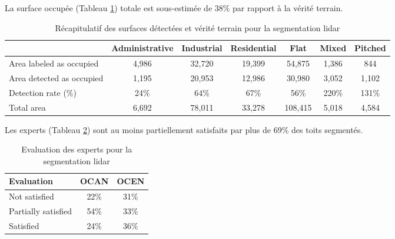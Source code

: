 {{{{\par{La surface occupée (Tableau \ref{tab:stdl_04_resultats_segmentation_lidar_affectation}) totale est sous-estimée de 38\% par rapport à la vérité terrain.}

\begin{table}[H]
    \centering
    \begin{tabular}{|p{2.7cm}|c|c|c|c|c|c|}
    \hline
    & Administrative & Industrial & Residential & Flat & Mixed & Pitched \\
    \hline
    Area labeled as occupied & 4,986 & 32,720 & 19,399 & 54,875 & 1,386 & 844 \\
    Area detected as occupied & 1,195 & 20,953 & 12,986 & 30,980 & 3,052 & 1,102 \\
    Detection rate (\%) & 24\% & 64\% & 67\% & 56\% & 220\% & 131\% \\
    Total area & 6,692 & 78,011 & 33,278 & 108,415 & 5,018 & 4,584 \\
    \hline
    \end{tabular}
    \caption{Récapitulatif des surfaces détectées et vérité terrain pour la segmentation \gls{lidar}}
    \label{tab:stdl_04_resultats_segmentation_lidar_affectation}
\end{table}


\newpage
\par{Les experts (Tableau \ref{tab:stdl_05_resultats_segmentation_lidar_experts}) sont au moins partiellement satisfaits par plus de 69\% des toits segmentés.}

\begin{table}[H]
    \centering
    \begin{tabular}{|l|c|c|}
    \hline
    Evaluation & OCAN & OCEN \\
    \hline
    Not satisfied & 22\% & 31\% \\
    Partially satisfied & 54\% & 33\% \\
    Satisfied & 24\% & 36\% \\
    \hline
    \end{tabular}
    \caption{Evaluation des experts pour la segmentation \gls{lidar}}
    \label{tab:stdl_05_resultats_segmentation_lidar_experts}
\end{table}

}}}}
